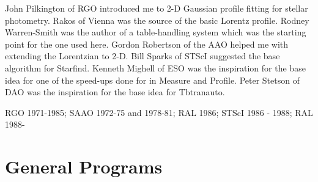   John Pilkington of RGO introduced me to 2-D Gaussian profile fitting
  for stellar photometry.  Rakos of Vienna was the source of the basic
  Lorentz profile.  Rodney Warren-Smith was the author of a
  table-handling system which was the starting point for the one used
  here.  Gordon Robertson of the AAO helped me with extending the
  Lorentzian to 2-D.  Bill Sparks of STScI suggested the base algorithm
  for Starfind.  Kenneth Mighell of ESO was the inspiration for the
  base idea for one of the speed-ups done for in Measure and Profile.
  Peter Stetson of DAO was the inspiration for the base idea for
  Tbtran{\undersc}auto.

  RGO 1971-1985; SAAO 1972-75 and 1978-81; RAL 1986; STScI 1986 - 1988;
  RAL 1988-

\newpage

\section{General Programs} 
\label{se:progs}

\newpage

